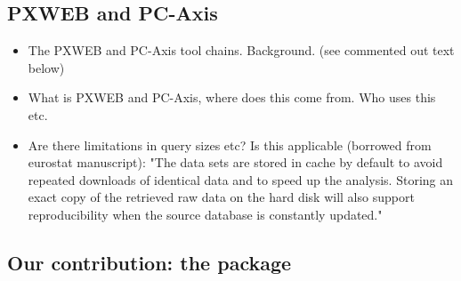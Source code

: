 \documentclass[article]{jss}
\begin{document}



\subsection[PXWEB and PC-Axis]{PXWEB and PC-Axis}

\begin{itemize}
    \item The PXWEB and PC-Axis tool chains. Background. (see commented out text below)
    \item What is PXWEB and PC-Axis, where does this come from. Who uses this etc.
    \item Are there limitations in query sizes etc? Is this applicable (borrowed from eurostat manuscript): "The data sets are stored in cache by default to avoid repeated downloads of identical data and to speed up the analysis. Storing an exact copy of the retrieved raw data on the hard disk will also support reproducibility when the source database is constantly updated."
\end{itemize}


\subsection{Our contribution: the  package }
\end{document}
